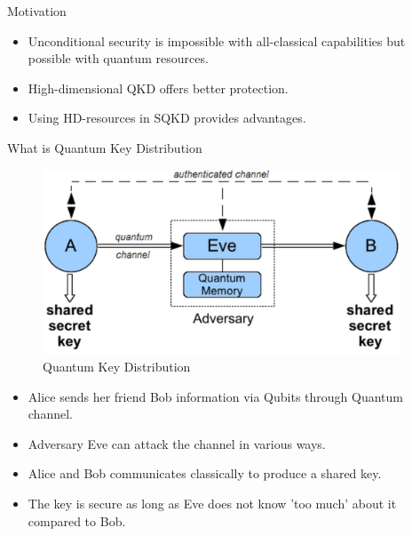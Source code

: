 \documentclass[final]{beamer}
\newlength{\sepwid}
\newlength{\onecolwid}
\begin{document}
\begin{frame}[t]
\begin{columns}[t]
\begin{column}{\onecolwid}
\begin{block}{Motivation}
\begin{itemize}
\item Unconditional security is impossible with all-classical capabilities but possible with quantum resources. 
\item High-dimensional QKD offers better protection.
\item Using HD-resources in SQKD provides advantages. 
\end{itemize}

\end{block}


\begin{block}{What is Quantum Key Distribution}
	
	\begin{figure}
		\includegraphics[width=\linewidth]{qkd.png}
		\caption{Quantum Key Distribution}
	\end{figure}
\begin{itemize}
\item Alice sends her friend Bob information via Qubits through Quantum channel.
\item Adversary Eve can attack the channel in various ways.
\item Alice and Bob communicates classically to produce a shared key.
\item The key is secure as long as Eve does not know 'too much' about it compared to Bob.
\end{itemize}	
	
\end{block}


\end{column} %


\begin{column}{\sepwid}\end{column} %


\end{columns}
\end{frame}
\end{document}
